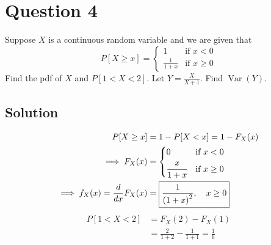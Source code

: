 \section*{Question 4}

Suppose \( X \) is a continuous random variable and we are given that
\begin{equation*}
    P[X \geq x] =
    \begin{cases}
        1             & \text{if } x < 0    \\
        \frac{1}{1+x} & \text{if } x \geq 0
    \end{cases}
\end{equation*}
Find the pdf of \(X\) and \( P[1<X<2] \).
Let \( Y = \frac{X}{X+1} \).
Find \( \operatorname{Var}{(Y)} \).

\subsection*{Solution}

\begin{align*}
    P[X \geq x]
     & =
    1 - P[X < x]
    = 1 - F_X(x)
    \\
    \implies
    F_X(x)
     & =
    \begin{cases}
        0
         &
        \text{if } x < 0
        \\
        \cfrac{x}{1+x}
         &
        \text{if } x \geq 0
    \end{cases}
    \\
    \implies
    f_X(x)
    =
    \frac{d}{dx} F_X(x)
     & =
    \boxed{
        \frac{1}{{(1+x)}^2},
        \quad
        x \geq 0
    }
\end{align*}
\begin{align*}
    P[1<X<2]
     & =
    F_X(2) - F_X(1)
    \\ & =
    \frac{2}{1+2} - \frac{1}{1+1}
    = \boxed{
        \frac{1}{6}
    }
\end{align*}
